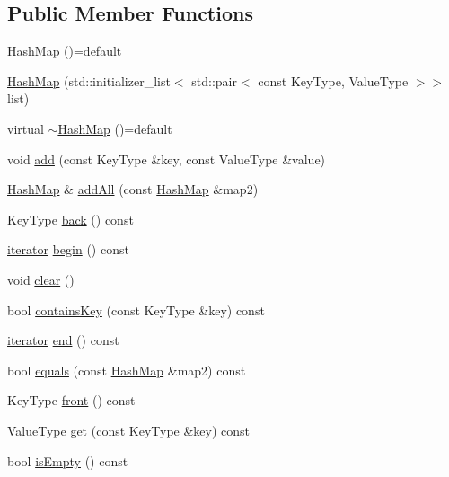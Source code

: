 \subsection*{Public Member Functions}
\begin{DoxyCompactItemize}
\item 
\mbox{\hyperlink{classHashMap_a3027d2d14763d6db504f99530ae6d08d}{Hash\+Map}} ()=default
\item 
\mbox{\hyperlink{classHashMap_ab753a1db3cac1cff8349801d448ec63d}{Hash\+Map}} (std\+::initializer\+\_\+list$<$ std\+::pair$<$ const Key\+Type, Value\+Type $>$$>$ list)
\item 
virtual \mbox{\hyperlink{classHashMap_a80714b3ce58e1138cd23b2dd4e14337e}{$\sim$\+Hash\+Map}} ()=default
\item 
void \mbox{\hyperlink{classHashMap_a9129d6095063e7e14d85c627d35086a5}{add}} (const Key\+Type \&key, const Value\+Type \&value)
\item 
\mbox{\hyperlink{classHashMap}{Hash\+Map}} \& \mbox{\hyperlink{classHashMap_acda70726afb75a7250066bb06aff7ef9}{add\+All}} (const \mbox{\hyperlink{classHashMap}{Hash\+Map}} \&map2)
\item 
Key\+Type \mbox{\hyperlink{classHashMap_adfa4b8f8e4f5ecc11fb76a3efba70d70}{back}} () const
\item 
\mbox{\hyperlink{classHashMap_ab3d10e70baaeac78e76b7abae7e2cf76}{iterator}} \mbox{\hyperlink{classHashMap_a34956cd3bc086bee3fe9db3a154fa27c}{begin}} () const
\item 
void \mbox{\hyperlink{classHashMap_ac8bb3912a3ce86b15842e79d0b421204}{clear}} ()
\item 
bool \mbox{\hyperlink{classHashMap_a37473445b6725c5f0fc59a32ea2e645e}{contains\+Key}} (const Key\+Type \&key) const
\item 
\mbox{\hyperlink{classHashMap_ab3d10e70baaeac78e76b7abae7e2cf76}{iterator}} \mbox{\hyperlink{classHashMap_aa8c87f05459dc398237d8d67d40294d9}{end}} () const
\item 
bool \mbox{\hyperlink{classHashMap_a2f1c1f416ba37a002b491d1ea54cd40e}{equals}} (const \mbox{\hyperlink{classHashMap}{Hash\+Map}} \&map2) const
\item 
Key\+Type \mbox{\hyperlink{classHashMap_a6e76878901fa73e176909ac015834f1a}{front}} () const
\item 
Value\+Type \mbox{\hyperlink{classHashMap_a3ac97b0a9a7fa131221427f628667ae9}{get}} (const Key\+Type \&key) const
\item 
bool \mbox{\hyperlink{classHashMap_acf82f9b2937375c7b1cf3dccb3df3312}{is\+Empty}} () const
$$
\end{DoxyCompactItemize}
